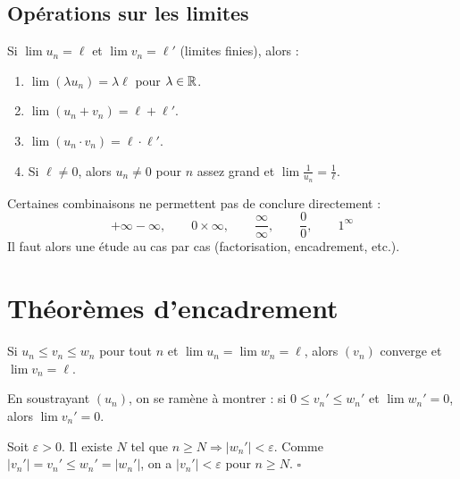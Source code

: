 \subsection{Opérations sur les limites}

\begin{propbox}
Si $\displaystyle\lim u_n = \ell$ et $\displaystyle\lim v_n = \ell'$ (limites finies), alors :
\begin{enumerate}[leftmargin=1.5cm]
  \item $\displaystyle\lim (\lambda u_n) = \lambda \ell$ \quad pour $\lambda \in \mathbb{R}$.
  \item $\displaystyle\lim (u_n + v_n) = \ell + \ell'$.
  \item $\displaystyle\lim (u_n \cdot v_n) = \ell \cdot \ell'$.
  \item Si $\ell \neq 0$, alors $u_n \neq 0$ pour $n$ assez grand et $\displaystyle\lim \frac{1}{u_n} = \frac{1}{\ell}$.
\end{enumerate}
\end{propbox}

\begin{rembox}
Certaines combinaisons ne permettent pas de conclure directement :
\[
  +\infty - \infty, \qquad 0 \times \infty, \qquad \frac{\infty}{\infty}, \qquad \frac{0}{0}, \qquad 1^\infty
\]
Il faut alors une étude au cas par cas (factorisation, encadrement, etc.).
\end{rembox}


\section{Théorèmes d'encadrement}

\begin{thmbox}
Si $u_n \leqslant v_n \leqslant w_n$ pour tout $n$ et $\displaystyle\lim u_n = \lim w_n = \ell$, alors $(v_n)$ converge et $\displaystyle\lim v_n = \ell$.
\end{thmbox}

\begin{proofbox}
En soustrayant $(u_n)$, on se ramène à montrer : si $0 \leqslant v_n' \leqslant w_n'$ et $\lim w_n' = 0$, alors $\lim v_n' = 0$.

Soit $\varepsilon > 0$. Il existe $N$ tel que $n \geqslant N \Rightarrow |w_n'| < \varepsilon$. Comme $|v_n'| = v_n' \leqslant w_n' = |w_n'|$, on a $|v_n'| < \varepsilon$ pour $n \geqslant N$. \hfill$\square$
\end{proofbox}

